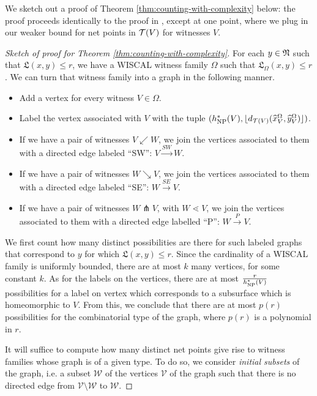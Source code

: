 We sketch out a proof of Theorem \ref{thm:counting-with-complexity} below: the proof proceeds identically to the proof in \textcite{dowdall2023lattice}, except at one point, where we plug in our weaker bound for net points in $\mathcal{T}(V)$ for witnesses $V$.

\begin{proof}[Sketch of proof for Theorem \ref{thm:counting-with-complexity}]
  For each $y \in \mathfrak{N}$ such that $\mathfrak{L}(x,y) \leq r$, we have a WISCAL witness family $\Omega$ such that $\mathfrak{L}_{\Omega}(x,y) \leq r$.
  We can turn that witness family into a graph in the following manner.
  \begin{itemize}
  \item Add a vertex for every witness $V \in \Omega$.
  \item Label the vertex associated with $V$ with the tuple $(h_{\mathrm{NP}}^{\ast}(V), \lfloor d_{\mathcal{T}(V)}(\widehat{x}_{V}^{\Omega}, \widehat{y}_{V}^{\Omega}) \rfloor)$.
  \item If we have a pair of witnesses $V \swarrow W$, we join the vertices associated to them with a directed edge labeled ``SW'': $V \xrightarrow{SW} W$.
  \item If we have a pair of witnesses $W \searrow V$, we join the vertices associated to them with a directed edge labeled ``SE'': $W \xrightarrow{SE} V$.
  \item If we have a pair of witnesses $W \pitchfork V$, with $W \lessdot V$, we join the vertices associated to them with a directed edge labelled ``P'': $W \xrightarrow{P} V$.
  \end{itemize}

  We first count how many distinct possibilities are there for such labeled graphs that correspond to $y$ for which $\mathfrak{L}(x,y) \leq r$.
  Since the cardinality of a WISCAL family is uniformly bounded, there are at most $k$ many vertices, for some constant $k$.
  As for the labels on the vertices, there are at most $\frac{r}{h_{\mathrm{NP}}^{\ast}(V)}$ possibilities for a label on vertex which corresponds to a subsurface which is homeomorphic to $V$.
  From this, we conclude that there are at most $p(r)$ possibilities for the combinatorial type of the graph, where $p(r)$ is a polynomial in $r$.

  It will suffice to compute how many distinct net points give rise to witness families whose graph is of a given type.
  To do so, we consider \emph{initial subsets} of the graph, i.e. a subset $\mathcal{W}$ of the vertices $\mathcal{V}$ of the graph such that there is no directed edge from $\mathcal{V} \setminus \mathcal{W}$ to $\mathcal{W}$.


\end{proof}
